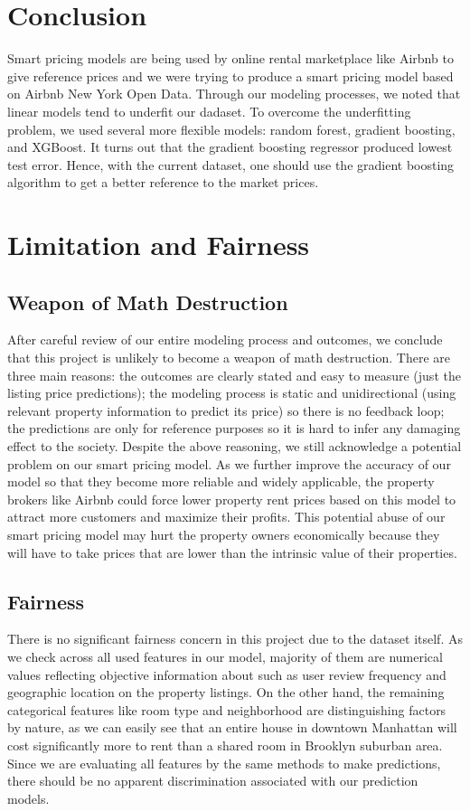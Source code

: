 \documentclass[twocolumn]{article}
\begin{document}
\section{Conclusion}

Smart pricing models are being used by online rental marketplace like Airbnb to give reference prices and we were trying to produce a smart pricing model based on Airbnb New York Open Data. Through our modeling processes, we noted that linear models tend to underfit our dadaset. To overcome the underfitting problem, we used several more flexible models: random forest, gradient boosting, and XGBoost. It turns out that the gradient boosting regressor produced lowest test error. Hence, with the current dataset, one should use the gradient boosting algorithm to get a better reference to the market prices. 

\section{Limitation and Fairness}
\subsection{Weapon of Math Destruction}
After careful review of our entire modeling process and outcomes, we conclude that this project is unlikely to become a weapon of math destruction. There are three main reasons: the outcomes are clearly stated and easy to measure (just the listing price predictions); the modeling process is static and unidirectional (using relevant property information to predict its price) so there is no feedback loop; the predictions are only for reference purposes so it is hard to infer any damaging effect to the society. Despite the above reasoning, we still acknowledge a potential problem on our smart pricing model. As we further improve the accuracy of our model so that they become more reliable and widely applicable, the property brokers like Airbnb could force lower property rent prices based on this model to attract more customers and maximize their profits. This potential abuse of our smart pricing model may hurt the property owners economically because they will have to take prices that are lower than the intrinsic value of their properties. 

\subsection{Fairness}
There is no significant fairness concern in this project due to the dataset itself. As we check across all used features in our model, majority of them are numerical values reflecting objective information about such as user review frequency and geographic location on the property listings. On the other hand, the remaining categorical features like room type and neighborhood are distinguishing factors by nature, as we can easily see that an entire house in downtown Manhattan will cost significantly more to rent than a shared room in Brooklyn suburban area. Since we are evaluating all features by the same methods to make predictions, there should be no apparent discrimination associated with our prediction models.  
\end{document}
